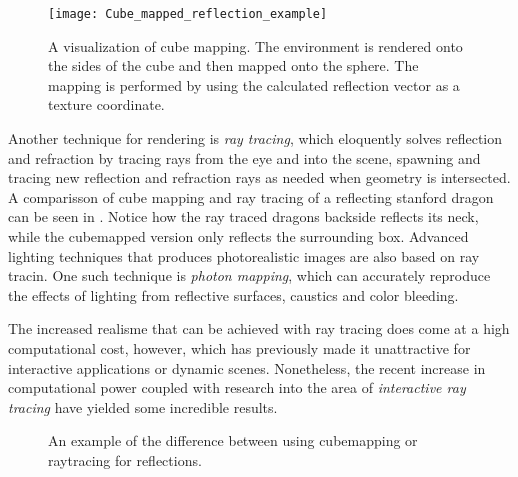 \begin{figure}
  \centering
  \texttt{[image: Cube\_mapped\_reflection\_example]}
  
  \vspace{3mm}
  \parbox{7cm}{\caption[Cube mapping visualized.]{A visualization of
      cube mapping. The environment is rendered onto the sides of the
      cube and then mapped onto the sphere. The mapping is performed
      by using the calculated reflection vector as a texture
      coordinate.}\label{fig:cubemap}}
\end{figure}


Another technique for rendering is \textit{ray tracing}, which
eloquently solves reflection and refraction by tracing rays from the
eye and into the scene, spawning and tracing new reflection and
refraction rays as needed when geometry is intersected. A comparisson
of cube mapping and ray tracing of a reflecting stanford dragon can be
seen in . Notice how the ray traced
dragons backside reflects its neck, while the cubemapped version only
reflects the surrounding box. Advanced lighting techniques that
produces photorealistic images are also based on ray tracin. One such
technique is \textit{photon mapping}, which can accurately reproduce
the effects of lighting from reflective surfaces, caustics and color
bleeding.



The increased realisme that can be achieved with ray tracing does come
at a high computational cost, however, which has previously made it
unattractive for interactive applications or dynamic
scenes. Nonetheless, the recent increase in computational power
coupled with research into the area of \textit{interactive ray
  tracing} have yielded some incredible results.

\begin{figure}
  \centering
  \hspace{10pt}
  \caption[Cubemapping vs raytracing for reflections.]{An example of
    the difference between using cubemapping or raytracing for
    reflections.}
  \label{fig:reflectingDragons}
\end{figure}


